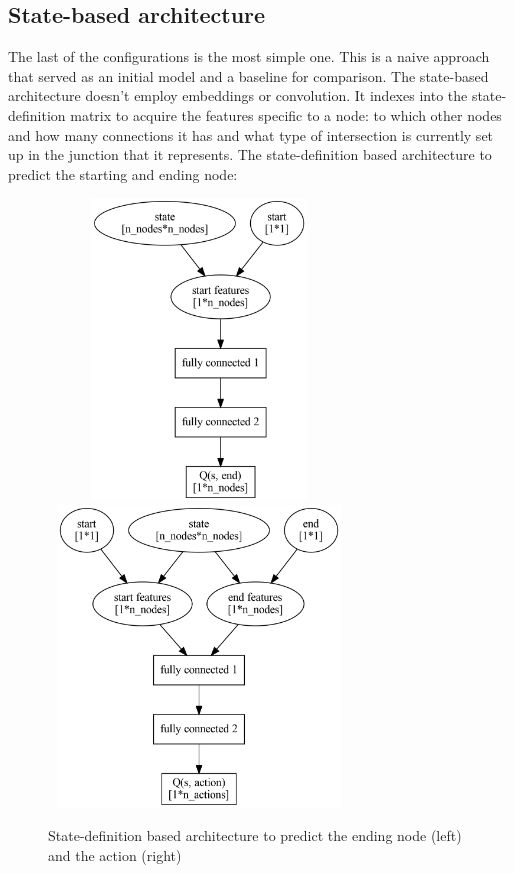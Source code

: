 \documentclass[
]{elteikthesis}[2023/04/10]
\begin{document}
\subsection{State-based architecture}

The last of the configurations is the most simple one. This is a naive
approach that served as an initial model and a baseline for comparison.
The state-based architecture doesn't employ embeddings or convolution.
It indexes into the state-definition matrix to acquire the features
specific to a node: to which other nodes and how many connections
it has and what type of intersection is currently set up in the junction
that it represents. The state-definition based architecture to predict
the starting and ending node: 

\begin{figure}[H]
\begin{centering}
\includegraphics[width=8cm,height=8cm,keepaspectratio]{images/snn_end}
\includegraphics[width=8cm,height=8cm,keepaspectratio]{images/snn_action}
\par\end{centering}
\caption{State-definition based architecture to predict the ending node (left)
and the action (right)}

\end{figure}
\end{document}
